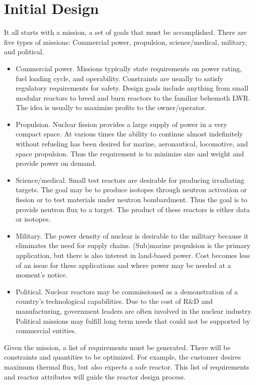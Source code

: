 \documentclass[]{article}
\begin{document}
\section{Initial Design}
It all starts with a mission, a set of goals that must be accomplished. There are five types of missions: Commercial power, propulsion, science/medical, military, and political.
\begin{itemize}
  \item Commercial power. Missions typically state requirements on power rating, fuel loading cycle, and operability. Constraints are usually to satisfy regulatory requirements for safety. Design goals include anything from small modular reactors to breed and burn reactors to the familiar behemoth LWR. The idea is usually to maximize profits to the owner/operator.
  \item Propulsion. Nuclear fission provides a large supply of power in a very compact space. At various times the ability to continue almost indefinitely without refueling has been desired for marine, aeronautical, locomotive, and space propulsion. Thus the requirement is to minimize size and weight and provide power on demand.
  \item Science/medical. Small test reactors are desirable for producing irradiating targets. The goal may be to produce isotopes through neutron activation or fission or to test materials under neutron bombardment. Thus the goal is to provide neutron flux to a target. The product of these reactors is either data or isotopes. 
  \item Military. The power density of nuclear is desirable to the military because it eliminates the need for supply chains. (Sub)marine propulsion is the primary application, but there is also interest in land-based power. Cost becomes less of an issue for these applications and where power may be needed at a moment's notice.
  \item Political. Nuclear reactors may be commissioned as a demonstration of a country's technological capabilities. Due to the cost of R\&D and manufacturing, government leaders are often involved in the nuclear industry. Political missions may fulfill long term needs that could not be supported by commercial entities.
\end{itemize}

Given the mission, a list of requirements must be generated. There will be constraints and quantities to be optimized. For example, the customer desires maximum thermal flux, but also expects a safe reactor. This list of requirements and reactor attributes will guide the reactor design process.
\end{document}
